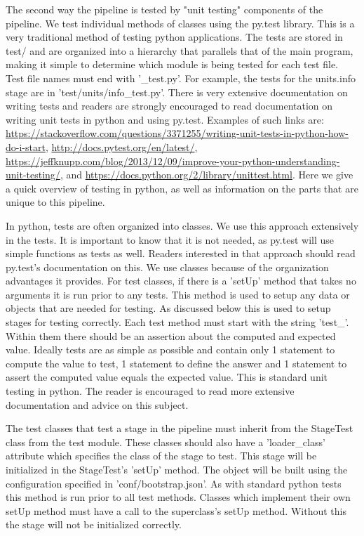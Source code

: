The second way the pipeline is tested by "unit testing" components of the
pipeline. We test individual methods of classes using the py.test library. This
is a very traditional method of testing python applications. The tests are
stored in test/ and are organized into a hierarchy that parallels that of the
main program, making it simple to determine which module is being tested for
each test file. Test file names must end with '\_test.py'. For example, the
tests for the units.info stage are in 'test/units/info\_test.py'.  There is very
extensive documentation on writing tests and readers are strongly encouraged to
read documentation on writing unit tests in python and using py.test. Examples
of such links are:
\url{https://stackoverflow.com/questions/3371255/writing-unit-tests-in-python-how-do-i-start},
\url{http://docs.pytest.org/en/latest/},
\url{https://jeffknupp.com/blog/2013/12/09/improve-your-python-understanding-unit-testing/},
and \url{https://docs.python.org/2/library/unittest.html}. Here we give a quick
overview of testing in python, as well as information on the parts that are
unique to this pipeline.

In python, tests are often organized into classes. We use this approach
extensively in the tests. It is important to know that it is not needed, as
py.test will use simple functions as tests as well. Readers interested in that
approach should read py.test's documentation on this. We use classes because of
the organization advantages it provides. For test classes, if there is a 'setUp'
method that takes no arguments it is run prior to any tests. This method is used
to setup any data or objects that are needed for testing. As discussed below
this is used to setup stages for testing correctly. Each test method must start
with the string 'test\_'. Within them there should be an assertion about the
computed and expected value. Ideally tests are as simple as possible and contain
only 1 statement to compute the value to test, 1 statement to define the answer
and 1 statement to assert the computed value equals the expected value. This is
standard unit testing in python. The reader is encouraged to read more extensive
documentation and advice on this subject.

The test classes that test a stage in the pipeline must inherit from the
StageTest class from the test module. These classes should also have a
'loader\_class' attribute which specifies the class of the stage to test. This
stage will be initialized in the StageTest's 'setUp' method. The object will be
built using the configuration specified in 'conf/bootstrap.json'. As with
standard python tests this method is run prior to all test methods. Classes
which implement their own setUp method must have a call to the superclass's
setUp method. Without this the stage will not be initialized correctly.

